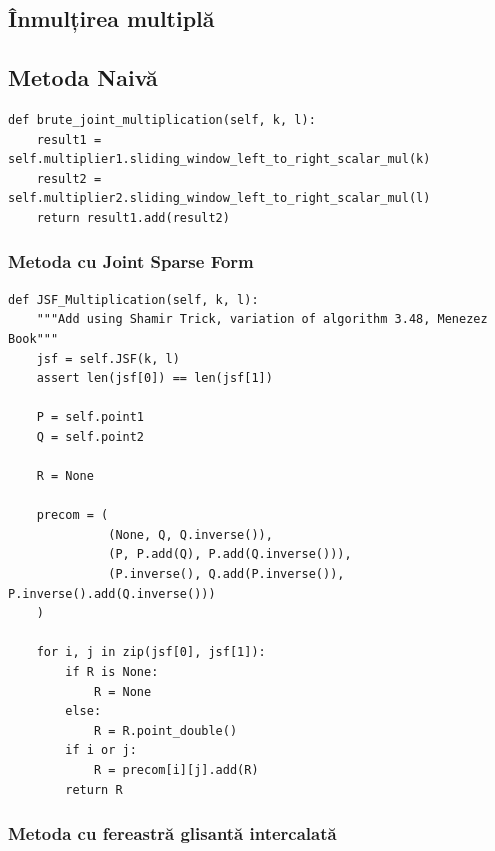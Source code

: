 \subsection{Înmulțirea multiplă}
\label{subsec:subsec04}

\subsection{Metoda Naivă}

\begin{lstlisting}
def brute_joint_multiplication(self, k, l):
    result1 = self.multiplier1.sliding_window_left_to_right_scalar_mul(k)
    result2 = self.multiplier2.sliding_window_left_to_right_scalar_mul(l)
    return result1.add(result2)
\end{lstlisting}

\subsubsection{Metoda cu Joint Sparse Form}

\begin{lstlisting}
def JSF_Multiplication(self, k, l):
    """Add using Shamir Trick, variation of algorithm 3.48, Menezez Book"""
    jsf = self.JSF(k, l)
    assert len(jsf[0]) == len(jsf[1])

    P = self.point1
    Q = self.point2

    R = None

    precom = (
              (None, Q, Q.inverse()),
              (P, P.add(Q), P.add(Q.inverse())),
              (P.inverse(), Q.add(P.inverse()), P.inverse().add(Q.inverse()))
    )

    for i, j in zip(jsf[0], jsf[1]):
        if R is None:
            R = None
        else:
            R = R.point_double()
        if i or j:
            R = precom[i][j].add(R)
        return R
\end{lstlisting}

\subsubsection{Metoda cu fereastră glisantă intercalată}

